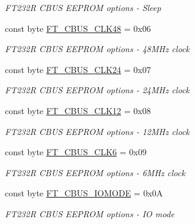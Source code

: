 \begin{DoxyCompactItemize}
\begin{DoxyCompactList}\small\item\em F\+T232R C\+B\+US E\+E\+P\+R\+OM options -\/ Sleep \end{DoxyCompactList}\item 
const byte \mbox{\hyperlink{class_f_t_d2_x_x___n_e_t_1_1_f_t_d_i_1_1_f_t___c_b_u_s___o_p_t_i_o_n_s_ad7d67923f17d4448dfa350a570214075}{F\+T\+\_\+\+C\+B\+U\+S\+\_\+\+C\+L\+K48}} = 0x06
\begin{DoxyCompactList}\small\item\em F\+T232R C\+B\+US E\+E\+P\+R\+OM options -\/ 48M\+Hz clock \end{DoxyCompactList}\item 
const byte \mbox{\hyperlink{class_f_t_d2_x_x___n_e_t_1_1_f_t_d_i_1_1_f_t___c_b_u_s___o_p_t_i_o_n_s_aa20b06b54f31b3f9b897208c14b40b31}{F\+T\+\_\+\+C\+B\+U\+S\+\_\+\+C\+L\+K24}} = 0x07
\begin{DoxyCompactList}\small\item\em F\+T232R C\+B\+US E\+E\+P\+R\+OM options -\/ 24M\+Hz clock \end{DoxyCompactList}\item 
const byte \mbox{\hyperlink{class_f_t_d2_x_x___n_e_t_1_1_f_t_d_i_1_1_f_t___c_b_u_s___o_p_t_i_o_n_s_acd3287249b83b07d2078adadafd47c6b}{F\+T\+\_\+\+C\+B\+U\+S\+\_\+\+C\+L\+K12}} = 0x08
\begin{DoxyCompactList}\small\item\em F\+T232R C\+B\+US E\+E\+P\+R\+OM options -\/ 12M\+Hz clock \end{DoxyCompactList}\item 
const byte \mbox{\hyperlink{class_f_t_d2_x_x___n_e_t_1_1_f_t_d_i_1_1_f_t___c_b_u_s___o_p_t_i_o_n_s_a600e995a4391ddaa637d321f65a3c5e1}{F\+T\+\_\+\+C\+B\+U\+S\+\_\+\+C\+L\+K6}} = 0x09
\begin{DoxyCompactList}\small\item\em F\+T232R C\+B\+US E\+E\+P\+R\+OM options -\/ 6M\+Hz clock \end{DoxyCompactList}\item 
const byte \mbox{\hyperlink{class_f_t_d2_x_x___n_e_t_1_1_f_t_d_i_1_1_f_t___c_b_u_s___o_p_t_i_o_n_s_a362f149805e43bfa70c08271d16a893d}{F\+T\+\_\+\+C\+B\+U\+S\+\_\+\+I\+O\+M\+O\+DE}} = 0x0A
\begin{DoxyCompactList}\small\item\em F\+T232R C\+B\+US E\+E\+P\+R\+OM options -\/ IO mode \end{DoxyCompactList}\item 

\end{DoxyCompactItemize}
